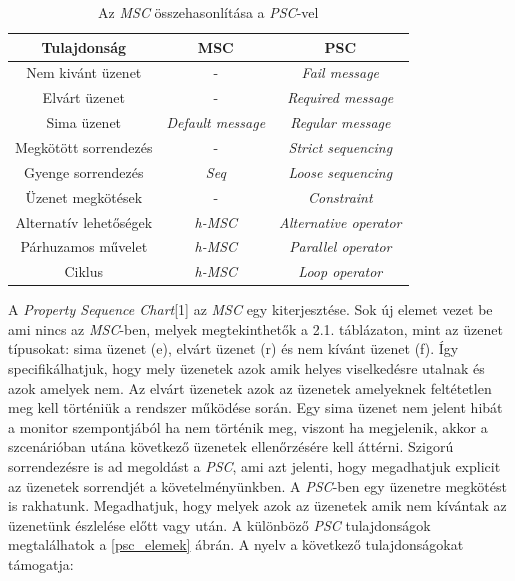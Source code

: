 \begin{table}[ht]
    \centering %
    \begin{tabular}{ |c|c|c| } %
    \hline
    \textbf{Tulajdonság} & \textbf{MSC} & \textbf{PSC} \\ [0.5ex] %
    \hline %
    \hline
    Nem kivánt üzenet & - & \textit{Fail message} \\ %
    \hline
    Elvárt üzenet & - & \textit{Required message} \\
    \hline
    Sima üzenet & \textit{Default message} & \textit{Regular message} \\
    \hline
    Megkötött sorrendezés & - & \textit{Strict sequencing} \\
    \hline
    Gyenge sorrendezés & \textit{Seq} & \textit{Loose sequencing} \\
    \hline
    Üzenet megkötések & - & \textit{Constraint} \\
    \hline
    Alternatív lehetőségek & \textit{h-MSC} & \textit{Alternative operator} \\
    \hline
    Párhuzamos művelet & \textit{h-MSC} & \textit{Parallel operator} \\
    \hline
    Ciklus & \textit{h-MSC} & \textit{Loop operator} \\
    \hline %
    \end{tabular}
    \label{psc_táblázat} %
    \caption{Az \textit{MSC} összehasonlítása a \textit{PSC}-vel} %
\end{table}

A \textit{Property Sequence Chart}[1] az \textit{MSC} egy kiterjesztése.
Sok új elemet vezet be ami nincs az \textit{MSC}-ben, melyek megtekinthetők a 2.1. táblázaton, mint az üzenet típusokat: sima üzenet (e), elvárt üzenet (r) és nem kívánt üzenet (f).
Így specifikálhatjuk, hogy mely üzenetek azok amik helyes viselkedésre utalnak és azok amelyek nem.
Az elvárt üzenetek azok az üzenetek amelyeknek feltétetlen meg kell történiük a rendszer működése során.
Egy sima üzenet nem jelent hibát a monitor szempontjából ha nem történik meg, viszont ha megjelenik, akkor a szcenárióban utána következő üzenetek ellenőrzésére kell áttérni.
Szigorú sorrendezésre is ad megoldást a \textit{PSC}, ami azt jelenti, hogy megadhatjuk explicit az üzenetek sorrendjét a követelményünkben.
A \textit{PSC}-ben egy üzenetre megkötést is rakhatunk.
Megadhatjuk, hogy melyek azok az üzenetek amik nem kívántak az üzenetünk észlelése előtt vagy után.
A különböző \textit{PSC} tulajdonságok megtalálhatok a \ref{psc_elemek} ábrán.
A nyelv a következő tulajdonságokat támogatja:

